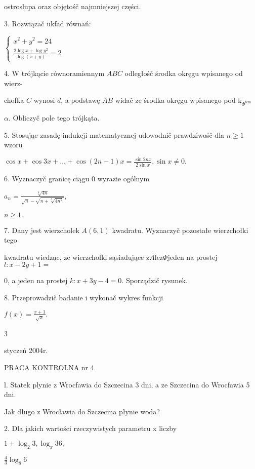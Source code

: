 \documentclass[a4paper,12pt]{article}
\begin{document}
ostroslupa oraz objętośč najmniejszej części.

3. Rozwiązač ukfad równań:

$\left\{\begin{array}{l}
x^{2}+y^{2}=24\\
\frac{2\log x+\log y^{2}}{\log(x+y)}=2
\end{array}\right.$

4. $\mathrm{W}$ trójkącie równoramiennym $ABC$ odległośč środka okręgu wpisanego od wierz-

chofka $C$ wynosi $d$, a podstawę $\overline{AB}$ widač ze środka okręgu wpisanego pod $\mathrm{k}_{\Phi^{\mathrm{t}\mathrm{e}\mathrm{m}}}$

$\alpha$. Obliczyč pole tego trójkąta.

5. Stosując zasadę indukcji matematycznej udowodnič prawdziwośč dla $n\geq 1$ wzoru

$\displaystyle \cos x+\cos 3x+\ldots+\cos(2n-1)x=\frac{\sin 2nx}{2\sin x},\sin x\neq 0.$

6. Wyznaczyč granicę ciągu 0 wyrazie ogólnym

$a_{n}=\displaystyle \frac{\sqrt[6]{4n}}{\sqrt{n}-\sqrt{n+\sqrt[3]{4n^{2}}}},$

$n\geq 1.$

7. Dany jest wierzcholek $A(6,1)$ kwadratu. Wyznaczyč pozostałe wierzchołki tego

kwadratu wiedząc, $\dot{\mathrm{z}}\mathrm{e}$ wierzchofki sąsiadujące $\mathrm{z}A\mathrm{l}\mathrm{e}\mathrm{z}\Phi$jeden na prostej $l:x-2y+1=$

$0$, a jeden na prostej $k:x+3y-4=0$. Sporządzič rysunek.

8. Przeprowadzič badanie $\mathrm{i}$ wykonač wykres funkcji

$f(x)=\displaystyle \frac{x+1}{\sqrt{x}}.$

3





styczeń 2004r.

PRACA KONTROLNA nr 4

l. Statek plynie z Wrocfawia do Szczecina 3 dni, a ze Szczecina do Wrocfawia 5 dni.

Jak długo z Wrocławia do Szczecina płynie woda?

2. Dla jakich wartości rzeczywistych parametru x liczby

$1+\log_{2}3, \log_{x}36,$

$\displaystyle \frac{4}{3}\log_{8}6$
\end{document}
